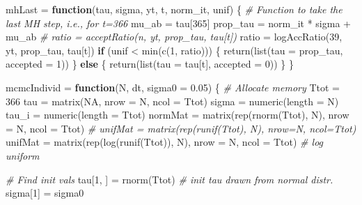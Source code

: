 \documentclass[
]{article}
\newenvironment{Shaded}{\begin{snugshade}}{\end{snugshade}}
\newcommand{\AttributeTok}[1]{\textcolor[rgb]{0.77,0.63,0.00}{#1}}
\newcommand{\CommentTok}[1]{\textcolor[rgb]{0.56,0.35,0.01}{\textit{#1}}}
\newcommand{\ConstantTok}[1]{\textcolor[rgb]{0.00,0.00,0.00}{#1}}
\newcommand{\ControlFlowTok}[1]{\textcolor[rgb]{0.13,0.29,0.53}{\textbf{#1}}}
\newcommand{\DecValTok}[1]{\textcolor[rgb]{0.00,0.00,0.81}{#1}}
\newcommand{\FloatTok}[1]{\textcolor[rgb]{0.00,0.00,0.81}{#1}}
\newcommand{\FunctionTok}[1]{\textcolor[rgb]{0.00,0.00,0.00}{#1}}
\newcommand{\NormalTok}[1]{#1}
\newcommand{\OtherTok}[1]{\textcolor[rgb]{0.56,0.35,0.01}{#1}}
\newcommand{\SpecialCharTok}[1]{\textcolor[rgb]{0.00,0.00,0.00}{#1}}
\begin{document}
\begin{Shaded}
\begin{Highlighting}[]
\NormalTok{mhLast }\OtherTok{=} \ControlFlowTok{function}\NormalTok{(tau, sigma, yt, t, norm\_it, unif) \{}
    \CommentTok{\# Function to take the last MH step, i.e., for t=366}
\NormalTok{    mu\_ab }\OtherTok{=}\NormalTok{ tau[}\DecValTok{365}\NormalTok{]}
\NormalTok{    prop\_tau }\OtherTok{=}\NormalTok{ norm\_it }\SpecialCharTok{*}\NormalTok{ sigma }\SpecialCharTok{+}\NormalTok{ mu\_ab}
    \CommentTok{\# ratio = acceptRatio(n, yt, prop\_tau, tau[t])}
\NormalTok{    ratio }\OtherTok{=} \FunctionTok{logAccRatio}\NormalTok{(}\DecValTok{39}\NormalTok{, yt, prop\_tau, tau[t])}
    \ControlFlowTok{if}\NormalTok{ (unif }\SpecialCharTok{\textless{}} \FunctionTok{min}\NormalTok{(}\FunctionTok{c}\NormalTok{(}\DecValTok{1}\NormalTok{, ratio))) \{}
        \FunctionTok{return}\NormalTok{(}\FunctionTok{list}\NormalTok{(}\AttributeTok{tau =}\NormalTok{ prop\_tau, }\AttributeTok{accepted =} \DecValTok{1}\NormalTok{))}
\NormalTok{    \} }\ControlFlowTok{else}\NormalTok{ \{}
        \FunctionTok{return}\NormalTok{(}\FunctionTok{list}\NormalTok{(}\AttributeTok{tau =}\NormalTok{ tau[t], }\AttributeTok{accepted =} \DecValTok{0}\NormalTok{))}
\NormalTok{    \}}
\NormalTok{\}}

\NormalTok{mcmcIndivid }\OtherTok{=} \ControlFlowTok{function}\NormalTok{(N, dt, }\AttributeTok{sigma0 =} \FloatTok{0.05}\NormalTok{) \{}
    \CommentTok{\# Allocate memory}
\NormalTok{    Ttot }\OtherTok{=} \DecValTok{366}
\NormalTok{    tau }\OtherTok{=} \FunctionTok{matrix}\NormalTok{(}\ConstantTok{NA}\NormalTok{, }\AttributeTok{nrow =}\NormalTok{ N, }\AttributeTok{ncol =}\NormalTok{ Ttot)}
\NormalTok{    sigma }\OtherTok{=} \FunctionTok{numeric}\NormalTok{(}\AttributeTok{length =}\NormalTok{ N)}
\NormalTok{    tau\_i }\OtherTok{=} \FunctionTok{numeric}\NormalTok{(}\AttributeTok{length =}\NormalTok{ Ttot)}
\NormalTok{    normMat }\OtherTok{=} \FunctionTok{matrix}\NormalTok{(}\FunctionTok{rep}\NormalTok{(}\FunctionTok{rnorm}\NormalTok{(Ttot), N), }\AttributeTok{nrow =}\NormalTok{ N, }\AttributeTok{ncol =}\NormalTok{ Ttot)}
    \CommentTok{\# unifMat = matrix(rep(runif(Ttot), N), nrow=N, ncol=Ttot)}
\NormalTok{    unifMat }\OtherTok{=} \FunctionTok{matrix}\NormalTok{(}\FunctionTok{rep}\NormalTok{(}\FunctionTok{log}\NormalTok{(}\FunctionTok{runif}\NormalTok{(Ttot)), N), }\AttributeTok{nrow =}\NormalTok{ N, }\AttributeTok{ncol =}\NormalTok{ Ttot)  }\CommentTok{\# log uniform}

    \CommentTok{\# Find init vals}
\NormalTok{    tau[}\DecValTok{1}\NormalTok{, ] }\OtherTok{=} \FunctionTok{rnorm}\NormalTok{(Ttot)  }\CommentTok{\# init tau drawn from normal distr.}
\NormalTok{    sigma[}\DecValTok{1}\NormalTok{] }\OtherTok{=}\NormalTok{ sigma0}


\end{Highlighting}
\end{Shaded}
\end{document}
